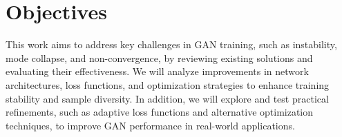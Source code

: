 \section*{Objectives}

This work aims to address key challenges in GAN training, such as instability, mode collapse, and non-convergence, by reviewing existing solutions and evaluating their effectiveness. We will analyze improvements in network architectures, loss functions, and optimization strategies to enhance training stability and sample diversity. In addition, we will explore and test practical refinements, such as adaptive loss functions and alternative optimization techniques, to improve GAN performance in real-world applications.